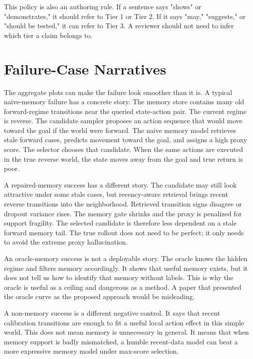 \documentclass{article}
\begin{document}
This policy is also an authoring rule. If a sentence says "shows" or
"demonstrates," it should refer to Tier 1 or Tier 2. If it says "may,"
"suggests," or "should be tested," it can refer to Tier 3. A reviewer should
not need to infer which tier a claim belongs to.

\section{Failure-Case Narratives}
\label{app:failure-narratives}

The aggregate plots can make the failure look smoother than it is. A typical
naive-memory failure has a concrete story. The memory store contains many old
forward-regime transitions near the queried state-action pair. The current
regime is reverse. The candidate sampler proposes an action sequence that
would move toward the goal if the world were forward. The naive memory model
retrieves stale forward cases, predicts movement toward the goal, and assigns
a high proxy score. The selector chooses that candidate. When the same actions
are executed in the true reverse world, the state moves away from the goal and
true return is poor.

A repaired-memory success has a different story. The candidate may still look
attractive under some stale cases, but recency-aware retrieval brings recent
reverse transitions into the neighborhood. Retrieved transition signs disagree
or dropout variance rises. The memory gate shrinks and the proxy is penalized
for support fragility. The selected candidate is therefore less dependent on a
stale forward memory tail. The true rollout does not need to be perfect; it
only needs to avoid the extreme proxy hallucination.

An oracle-memory success is not a deployable story. The oracle knows the
hidden regime and filters memory accordingly. It shows that useful memory
exists, but it does not tell us how to identify that memory without labels.
This is why the oracle is useful as a ceiling and dangerous as a method. A
paper that presented the oracle curve as the proposed approach would be
misleading.

A non-memory success is a different negative control. It says that recent
calibration transitions are enough to fit a useful local action effect in this
simple world. This does not mean memory is unnecessary in general. It means
that when memory support is badly mismatched, a humble recent-data model can
beat a more expressive memory model under max-score selection.
\end{document}
